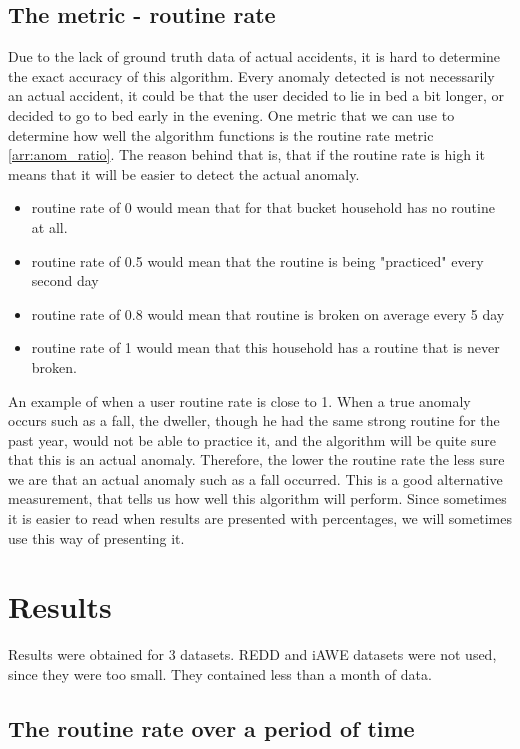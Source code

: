 \subsection{The metric - routine rate}

Due to the lack of ground truth data of actual accidents, it is hard to determine the 
exact accuracy of this algorithm. Every anomaly detected is not necessarily an 
actual accident, it could be that the user decided to lie in bed a bit longer, or decided to go to bed early in the evening.
One metric that we can use to determine how well the algorithm functions is the routine rate metric \ref{arr:anom_ratio}.
The reason behind that is, that if the routine rate is high it means that it will be easier to detect the actual anomaly.

\begin{itemize}
	\item routine rate of 0 would mean that for that bucket household has no routine at all.
    \item routine rate of 0.5 would mean that the routine is being "practiced" every second day
    \item routine rate of 0.8 would mean that routine is broken on average every 5 day
    \item routine rate of 1 would mean that this household has a routine that is never broken. 
\end{itemize}

An example of when a user routine rate is close to 1. When a true anomaly occurs such as a fall, the dweller, though he had the same strong routine for the past year, would not be able to practice it, and the algorithm will be quite sure that this is an actual anomaly.
Therefore, the lower the routine rate the less sure we are that an actual anomaly such as a fall occurred.
This is a good alternative measurement, that tells us how well this algorithm will perform. 
Since sometimes it is easier to read when results are presented with percentages, we will sometimes use this way of presenting it.
 
\section{Results} 

Results were obtained for 3 datasets. 
REDD and iAWE datasets were not used, since they were too small. 
They contained less than a month of data. 

\subsection{The routine rate over a period of time}

